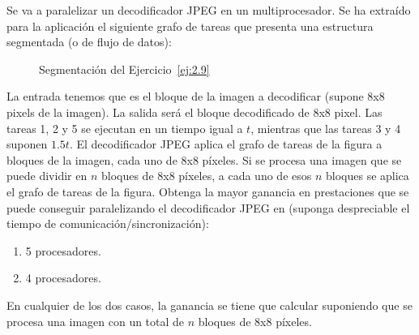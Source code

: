 \begin{ejercicio} \label{ej:2.9}
    Se va a paralelizar un decodificador JPEG en un multiprocesador. Se ha extraído para la aplicación
    el siguiente grafo de tareas que presenta una estructura segmentada (o de flujo de datos):
    \begin{figure}[H]
        \centering
        \caption{Segmentación del Ejercicio~\ref{ej:2.9}}
    \end{figure}
    La entrada tenemos que es el bloque de la imagen a decodificar (supone 8x8 pixels de la imagen).
    La salida será el bloque decodificado de 8x8 pixel. Las tareas 1, 2 y 5 se ejecutan en un tiempo igual a $t$,
    mientras que las tareas 3 y 4 suponen $1.5t$. El decodificador JPEG aplica el grafo de tareas de la figura a bloques de la imagen, cada uno de 8x8 píxeles. Si
    se procesa una imagen que se puede dividir en $n$ bloques de 8x8 píxeles, a cada uno de esos $n$ bloques se
    aplica el grafo de tareas de la figura. Obtenga la mayor ganancia en prestaciones que se puede conseguir
    paralelizando el decodificador JPEG en (suponga despreciable el tiempo de comunicación/sincronización):
    \begin{enumerate}
        \item 5 procesadores.
        \item 4 procesadores.
    \end{enumerate}

    En cualquier de los dos casos, la ganancia se tiene que calcular suponiendo que se procesa una imagen con un total de $n$ bloques de 8x8 píxeles.



\end{ejercicio}
